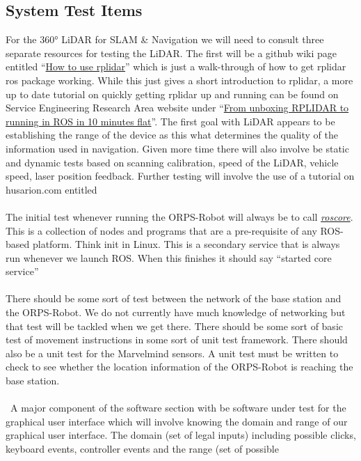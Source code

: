 \documentclass[english,12pt]{article}
\begin{document}
\subsection{System Test Items}
For the \ang{360} LiDAR for SLAM \& Navigation we will need to consult three separate 
resources for testing the LiDAR. The first will be a github wiki page entitled 
``\href{https://github.com/robopeak/rplidar_ros/wiki/How-to-use-rplidar}{How to use rplidar}'' 
which is just a walk-through of how to get rplidar ros package working. While this just gives 
a short introduction to rplidar, a more up to date tutorial on quickly getting rplidar up and 
running can be found on Service Engineering Research Area website under 
``\href{https://blog.zhaw.ch/icclab/rplidar/}{From unboxing RPLIDAR to running in ROS in 10 
minutes flat}''. The first goal with LiDAR appears to be establishing the range of the device 
as this what determines the quality of the information used in navigation. Given more time 
there will also involve be static and dynamic tests based on scanning calibration, 
speed of the LiDAR, vehicle speed, laser position feedback. Further testing will involve the use 
of a tutorial on husarion.com entitled \\\\
The initial test whenever running the ORPS-Robot will always be to call 
\href{http://wiki.ros.org/roscore}{\textit{roscore}}. 
This is a collection of nodes and programs that are a pre-requisite of any ROS-based platform. Think init 
in Linux. This is a secondary service that is always run whenever we launch ROS. When this finishes it should say 
``started core service''\\\\
There should be some sort of test between the network of the base station and the ORPS-Robot. We do not currently have much 
knowledge of networking but that test will be tackled when we get there. There should be some sort of basic 
test of movement instructions in some sort of unit test framework. There should also be a unit test for the 
Marvelmind sensors. A unit test must be written to check to see whether the location 
information of the ORPS-Robot is reaching the base station. \\\\\
A major component of the software section with be software under test for the graphical user interface which 
will involve knowing the domain and range of our graphical user interface. The domain (set of legal 
inputs) including possible clicks, keyboard events, controller events and the range (set of possible 
\end{document}
